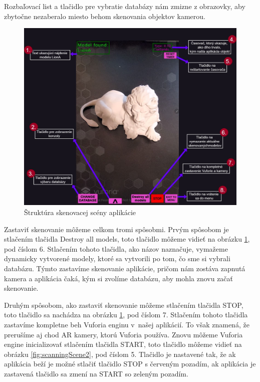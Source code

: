 Rozbaľovací list a tlačidlo pre vybratie databázy nám zmizne z obrazovky, aby zbytočne nezaberalo miesto behom skenovania objektov kamerou. 

\begin{figure}[!h]
  \centering
  \includegraphics[width=1\textwidth]{img/Scanning_scene_part1.jpg}
  \caption{Štruktúra skenovacej scény aplikácie}
  \label{fig:scanningScene1}
\end{figure}

Zastaviť skenovanie môžeme celkom tromi spôsobmi. Prvým spôsobom je stlačením tlačidla Destroy all models, toto tlačidlo môžeme vidieť na obrázku \ref{fig:scanningScene1}, pod číslom 6. Stlačením tohoto tlačidla, ako názov naznačuje, vymažeme dynamicky vytvorené modely, ktoré sa vytvorili po tom, čo sme si vybrali databázu. Týmto zastavíme skenovanie aplikácie, pričom nám zostáva zapnutá kamera a aplikácia čaká, kým si zvolíme databázu, aby mohla znovu začať skenovanie.

Druhým spôsobom, ako zastaviť skenovanie môžeme stlačením tlačidla STOP, toto tlačidlo sa nachádza na obrázku \ref{fig:scanningScene1}, pod číslom 7. Stlačením tohoto tlačidla zastavíme kompletne beh Vuforia enginu v~našej aplikácií. To však znamená, že prerušíme aj chod AR kamery, ktorú Vuforia používa. Znovu môžeme Vuforia engine inicializovať stlačením tlačidla START, toto tlačidlo môžeme vidieť na obrázku \ref{fig:scanningScene2}, pod číslom 5. Tlačidlo je nastavené tak, že ak aplikácia beží je možné stlačiť tlačidlo STOP s červeným pozadím, ak aplikácia je zastavená tlačidlo sa zmení na START so zeleným pozadím.

